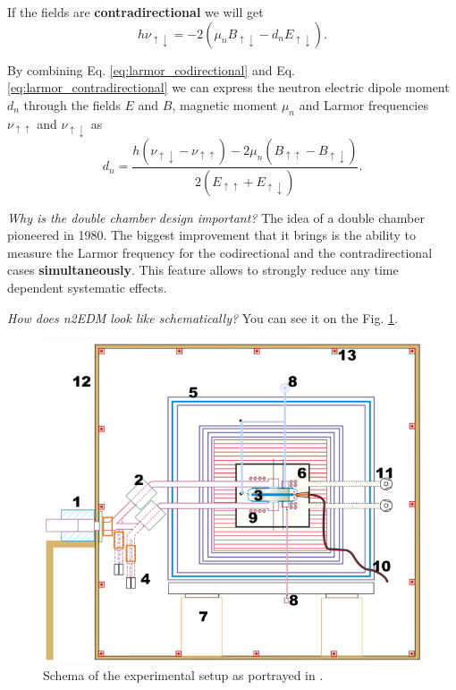 If the fields are \textbf{contradirectional} we will get
\begin{equation}
	h\nu_{\uparrow \downarrow} = -2 \left( \mu_n B_{\uparrow \downarrow} - d_n E_{\uparrow \downarrow} \right).
	\label{eq:larmor_contradirectional}
\end{equation}

By combining Eq. \ref{eq:larmor_codirectional} and Eq. \ref{eq:larmor_contradirectional} we can express the neutron electric dipole moment $d_n$ through the fields $E$ and $B$, magnetic moment $\mu_n$ and Larmor frequencies $\nu_{\uparrow \uparrow}$ and $\nu_{\uparrow \downarrow}$ as
\begin{equation}
	d_n = \frac{h \left( \nu_{\uparrow \downarrow} - \nu_{\uparrow \uparrow} \right) - 2 \mu_n \left( B_{\uparrow \uparrow} - B_{\uparrow \downarrow} \right)}{2 \left( E_{\uparrow \uparrow} + E_{\uparrow \downarrow} \right)}.
\end{equation}

\textit{Why is the double chamber design important?} The idea of a double chamber pioneered \cite{Altarev1980} in 1980. The biggest improvement that it brings is the ability to measure the Larmor frequency for the codirectional and the contradirectional cases \textbf{simultaneously}. This feature allows to strongly reduce \cite{Abel2018} any time dependent systematic effects.

\textit{How does n2EDM look like schematically?} You can see it on the Fig. \ref{fig:n2edm_schema}.%
\begin{figure}[h]
	\centering
	\includegraphics[width=.82\textwidth]{img/n2edm_schema}
	\caption{Schema of the experimental setup as portrayed in \cite{Abel2018}.}
	\label{fig:n2edm_schema}
\end{figure}

